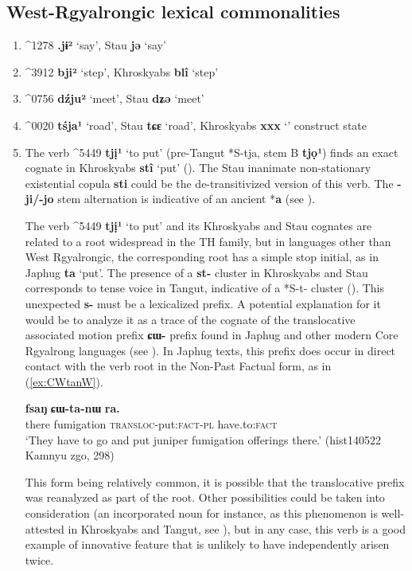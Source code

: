 \documentclass[oneside,a4paper,11pt]{article}
\newcommand{\ipa}[1]{{\phon\textbf{#1}}}
\newcommand{\wobzi}[2]{Khroskyabs \ipa{#1} `#2'}
\newcommand{\stau}[2]{Stau \ipa{#1} `#2'}
\newcommand{\tangut}[3]{\mo{#1}^{#1} \ipa{#2} `#3'}
\begin{document}
\subsection{West-Rgyalrongic lexical commonalities}
\begin{enumerate}
\item \tangut{1278}{.jɨ²}{say}, \stau{jə}{say}
\item \tangut{3912}{bji²}{step}, \wobzi{blî}{step} 
\item \tangut{0756}{dźju²}{meet}, \stau{dʑə}{meet}
\item \tangut{0020}{tśja¹}{road}, \stau{tɕɛ}{road}, \wobzi{xxx}{} construct state
\item  The verb \tangut{5449}{tjị¹}{to put} (pre-Tangut *S-tja, stem B  \ipa{tjọ¹}) finds an exact cognate in \wobzi{stî}{put} (\citealt{lai17khroskyabs}). The Stau inanimate non-stationary existential copula \ipa{sti} could be the de-transitivized version of this verb. The \ipa{-ji/-jo} stem alternation is indicative of an ancient *\ipa{a} (see \citealt[231-232]{jacques14esquisse}).

The verb \tangut{5449}{tjị¹}{to put} and its Khroskyabs and Stau cognates are related to a root widespread in the TH family, but in languages other than West Rgyalrongic, the corresponding root has a simple stop initial, as in Japhug \ipa{ta} `put'. The presence of  a \ipa{st-} cluster in Khroskyabs and Stau corresponds to tense voice in Tangut, indicative of a *S-t- cluster (\citealt{gong99jinyuanyin}). This unexpected \ipa{s-} must be a lexicalized prefix. A potential explanation for it would be to analyze it as a trace of the cognate of the translocative associated motion prefix \ipa{ɕɯ-} prefix found in Japhug and other modern Core Rgyalrong languages (see \citealt{jacques13harmonization}). In Japhug texts, this prefix does occur in direct contact with the verb root in the Non-Past Factual form, as in (\ref{ex:CWtanW}).

\begin{exe}
\ex \label{ex:CWtanW}
\gll \ipa{nɯtɕu} 	\ipa{fsaŋ} 	\ipa{ɕɯ-ta-nɯ} 	\ipa{ra.}  \\
 there fumigation \textsc{transloc}-put:\textsc{fact-pl} have.to:\textsc{fact} \\
 \glt `They have to go and put juniper fumigation offerings there.' (hist140522 Kamnyu zgo, 298)
\end{exe}

This form being relatively common, it is possible that the translocative prefix was reanalyzed as part of the root. Other possibilities could be taken into consideration (an incorporated noun for instance, as this phenomenon is well-attested in Khroskyabs and Tangut, see \citealt{jacques11tangut.verb}), but in any case, this verb is a good example of innovative feature that is unlikely to have independently arisen twice.
\end{enumerate}
\end{document}
